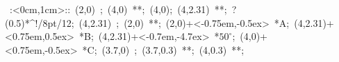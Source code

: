 %

\hbox{
\xy    <1cm,0cm>:<0cm,1cm>::
       (2,0) ; (4,0) **\dir{-};
       (4,0); (4,2.31) **\dir{-}; ?(0.5)*^!/8pt/{12}; 
       (4,2.31) ; (2,0) **\dir{-};  
       (2,0)+<-0.75em,-0.5ex> *{A};
       (4,2.31)+<0.75em,0.5ex> *{B};
       (4,2.31)+<-0.7em,-4.7ex> *\hbox{$50^\circ$};
       (4,0)+<0.75em,-0.5ex> *{C};
	(3.7,0) ; (3.7,0.3) **\dir{-}; (4,0.3) **\dir{-};
       \endxy}
	   

